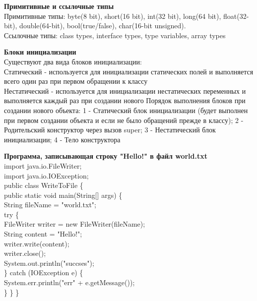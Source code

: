 \documentclass{article}
\begin{document}
\begin{minipage}{.3\textwidth}
    \textbf{Примитивные и ссылочные типы}\\
    Примитивные типы: 
byte(8 bit),
short(16 bit),
int(32 bit),
long(64 bit),
float(32-bit),
double(64-bit),
bool(true/false),
char(16-bit unsigned).\\
Ссылочные типы: class types, interface types, type variables, array types
    
\end{minipage}
\hfill
\begin{minipage}{.3\textwidth}
    \textbf{Блоки инициализации}\\
    Существуют два вида блоков инициализации:\\
    Статический - используется для инициализации статических полей и 
    выполняется всего один раз при первом обращении к классу\\
    Нестатический - используется для инициализации нестатических переменных и 
    выполняется каждый раз при создании нового
    Порядок выполнения блоков при создании нового объекта:
1 - Статический блок инициализации (будет выполнен при первом создании объекта и если не было обращений прежде в классу);
2 - Родительский конструктор через вызов super;
3 - Нестатический блок инициализации;
4 - Тело конструктора
\end{minipage}
\hfill
\begin{minipage}{.3\textwidth}
    \textbf{Программа, записывающая строку "Hello!" в файл world.txt}\\
        import java.io.FileWriter;\\
        import java.io.IOException;\\
        
        public class WriteToFile \{\\
            public static void main(String[] args) \{\\
                String fileName = "world.txt";\\
        
                try \{\\
                    FileWriter writer = new FileWriter(fileName);\\
                    String content = "Hello!";\\
                    writer.write(content);\\
                    writer.close();\\
        
                    System.out.println("succses");\\
                \} catch (IOException e) \{\\
                    System.err.println("err" + e.getMessage());\\
                \}
            \}
        \}

\end{minipage}
\\ \\
\end{document}
